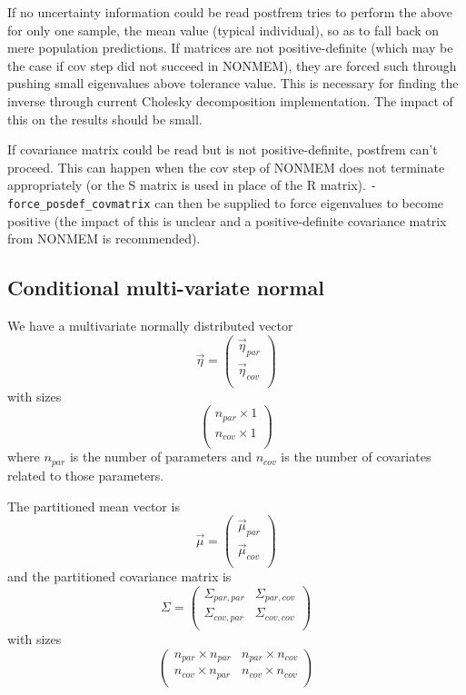 \noindent If no uncertainty information could be read postfrem tries to perform the above for only one sample, the mean
value (typical individual), so as to fall back on mere population predictions. If matrices are not positive-definite
(which may be the case if cov step did not succeed in NONMEM), they are forced such through pushing small eigenvalues
above tolerance value. This is necessary for finding the inverse through current Cholesky decomposition implementation.
The impact of this on the results should be small.

If covariance matrix could be read but is not positive-definite, postfrem can't proceed. This can happen when the cov
step of NONMEM does not terminate appropriately (or the S matrix is used in place of the R matrix).
\texttt{-force\_posdef\_covmatrix} can then be supplied to force eigenvalues to become positive (the impact of this is
unclear and a positive-definite covariance matrix from NONMEM is recommended).


\subsection*{Conditional multi-variate normal}

We have a multivariate normally distributed vector
\[
\vec{\eta} = \left(
\begin{array}{c}
\vec{\eta}_{par} \\
\vec{\eta}_{cov}\\
\end{array}
\right)
\]
with sizes
\[
\left(
\begin{array}{c}
n_{par} \times 1 \\
n_{cov} \times 1\\
\end{array}
\right)
\]
where $n_{par}$ is the number of parameters and $n_{cov}$ is the number of covariates related to those parameters.

The partitioned mean vector is
\[
\vec{\mu} = \left(
\begin{array}{c}
\vec{\mu}_{par} \\
\vec{\mu}_{cov}\\
\end{array}
\right)
\]
and the partitioned covariance matrix is
\[
\Sigma=\left(
\begin{array}{cc}
\Sigma_{par,par} & \Sigma_{par,cov}\\
\Sigma_{cov,par} & \Sigma_{cov,cov}\\
\end{array}
\right)
\]
with sizes
\[
\left(
\begin{array}{cc}
n_{par} \times n_{par} & n_{par} \times n_{cov}\\
n_{cov} \times n_{par} & n_{cov} \times n_{cov}\\
\end{array}
\right)
\]

